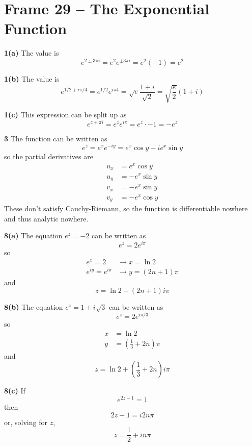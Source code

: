 \documentclass{article}
\renewcommand{\bar}{\overline}
\begin{document}
\section{Frame 29 -- The Exponential Function}
\textbf{1(a)}
The value is
\[
	e^{2 \pm 3\pi i} 
	= e^2 e^{\pm 3\pi i}
	= e^2 (-1)
	= e^2
\]

\textbf{1(b)}
The value is
\[
	e^{1/2 + i \pi/4}
	= e^{1/2} e^{i \pi 4}
	= \sqrt{e} \frac{1 + i}{\sqrt{2}}
	= \sqrt{\frac{e}{2}} (1 + i)
\]

\textbf{1(c)}
This expression can be split up as
\[
	e^{z + \pi i}
	= e^z e^{i \pi}
	= e^z \cdot -1
	= -e^z
\]

\textbf{3}
The function can be written as
\[
	e^{\bar{z}}
	= e^{x} e^{-iy}
	= e^x \cos y - i e^x \sin y
\]
so the partial derivatives are
\begin{align*}
	u_x &=  e^x \cos y \\
	u_y &= -e^x \sin y \\
	v_x &= -e^x \sin y \\
	v_y &= -e^x \cos y
\end{align*}
These don't satisfy Cauchy-Riemann, so the function is differentiable nowhere and thus analytic nowhere.

\textbf{8(a)}
The equation $e^z = -2$ can be written as
\[
	e^z = 2e^{i\pi}
\]
so
\begin{align*}
	e^x = 2				&\to x = \ln 2 \\
	e^{iy} = e^{i\pi}	&\to y = (2n + 1) \pi
\end{align*}
and
\[
	z = \ln 2 + (2n + 1) i\pi
\]

\textbf{8(b)}
The equation $e^z = 1 + i\sqrt{3}$ can be written as
\[
	e^z = 2 e^{i \pi/3}
\]
so
\begin{align*}
	x &= \ln 2 \\
	y &= \left( \frac{1}{3} + 2n \right) \pi
\end{align*}
and
\[
	z = \ln 2 + \left( \frac{1}{3} + 2n \right) i \pi
\]

\textbf{8(c)}
If
\[
	e^{2z - 1} = 1
\]
then
\[
	2z - 1 = i2n\pi
\]
or, solving for $z$,
\[
	z = \frac{1}{2} + i n\pi
\]
\end{document}
